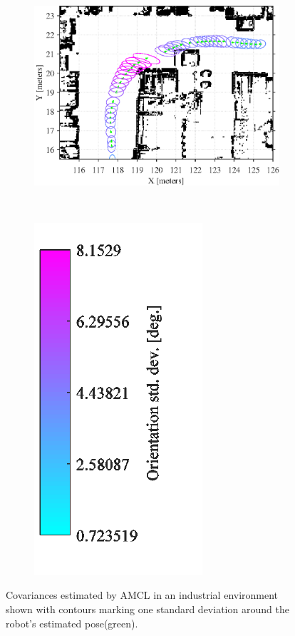\begin{figure}[tbph]
\centering
	\begin{subfigure}[b]{0.75\textwidth}
		\includegraphics[scale=1.0]{figures/static_mapping/amcl_covariance}		
		\label{fig:amcl_covariance}
	\end{subfigure}
	~ %
	\begin{subfigure}[b]{0.2\textwidth}
		\includegraphics[scale=1.0]{figures/static_mapping/amcl_covariance_bar}
		\label{fig:amcl_covariance_bar}
	\end{subfigure}
	\caption{Covariances estimated by AMCL in an industrial environment shown with contours marking one standard deviation around the robot's estimated pose(green).}
\end{figure}

